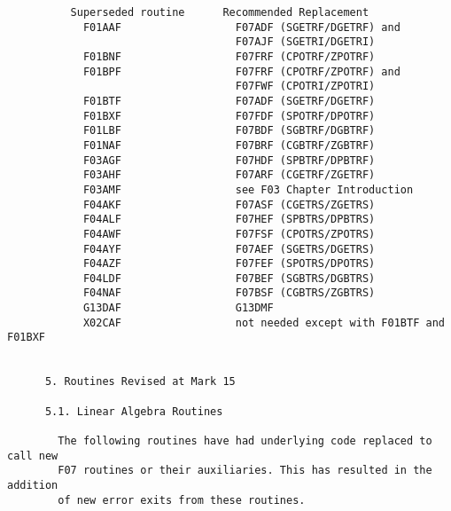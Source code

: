 \begin{small}
\begin{verbatim}
          Superseded routine      Recommended Replacement                        
            F01AAF                  F07ADF (SGETRF/DGETRF) and                   
                                    F07AJF (SGETRI/DGETRI)                       
            F01BNF                  F07FRF (CPOTRF/ZPOTRF)                       
            F01BPF                  F07FRF (CPOTRF/ZPOTRF) and                   
                                    F07FWF (CPOTRI/ZPOTRI)                       
            F01BTF                  F07ADF (SGETRF/DGETRF)                       
            F01BXF                  F07FDF (SPOTRF/DPOTRF)                       
            F01LBF                  F07BDF (SGBTRF/DGBTRF)                       
            F01NAF                  F07BRF (CGBTRF/ZGBTRF)                       
            F03AGF                  F07HDF (SPBTRF/DPBTRF)                       
            F03AHF                  F07ARF (CGETRF/ZGETRF)                       
            F03AMF                  see F03 Chapter Introduction                 
            F04AKF                  F07ASF (CGETRS/ZGETRS)                       
            F04ALF                  F07HEF (SPBTRS/DPBTRS)                       
            F04AWF                  F07FSF (CPOTRS/ZPOTRS)                       
            F04AYF                  F07AEF (SGETRS/DGETRS)                       
            F04AZF                  F07FEF (SPOTRS/DPOTRS)                       
            F04LDF                  F07BEF (SGBTRS/DGBTRS)                       
            F04NAF                  F07BSF (CGBTRS/ZGBTRS)                       
            G13DAF                  G13DMF                                       
            X02CAF                  not needed except with F01BTF and F01BXF     
                                                                                 
                                                                                 
      5. Routines Revised at Mark 15                                             
                                                                                 
      5.1. Linear Algebra Routines                                               
                                                                                 
        The following routines have had underlying code replaced to call new     
        F07 routines or their auxiliaries. This has resulted in the addition     
        of new error exits from these routines.                                  
                                                                                 

\end{verbatim}
\end{small}
